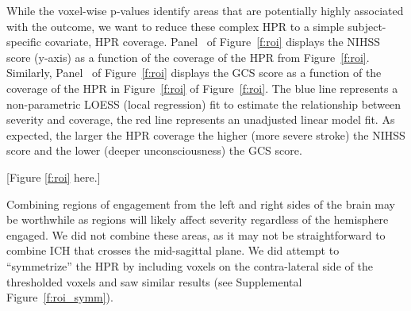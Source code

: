 \documentclass[10pt]{article}\usepackage[]{graphicx}\usepackage[]{color}
\begin{document}
%
%
%
%

While the voxel-wise p-values identify areas that are potentially highly associated with the outcome, we want to reduce these complex HPR to a simple subject-specific covariate, HPR coverage. Panel~\protect{} of Figure~\ref{f:roi} displays the NIHSS score (y-axis) as a function of the coverage of the HPR from Figure~\ref{f:roi}\protect{}. Similarly, Panel~\protect{} of Figure~\ref{f:roi} displays the GCS score as a function of the coverage of the HPR in Figure~\ref{f:roi}\protect{} of Figure~\ref{f:roi}.  The blue line represents a non-parametric LOESS (local regression) fit to estimate the relationship between severity and coverage, the red line represents an unadjusted linear model fit.  As expected, the larger the HPR coverage the higher (more severe stroke) the NIHSS score and the lower (deeper unconsciousness) the GCS score.

[Figure \ref{f:roi} here.]

Combining regions of engagement from the left and right sides of the brain may be worthwhile as regions will likely affect severity regardless of the hemisphere engaged.  We did not combine these areas, as it may not be straightforward to combine ICH that crosses the mid-sagittal plane.  We did attempt to ``symmetrize'' the HPR by including voxels on the contra-lateral side of the thresholded voxels and saw similar results (see Supplemental Figure~\ref{f:roi_symm}).
\end{document}
